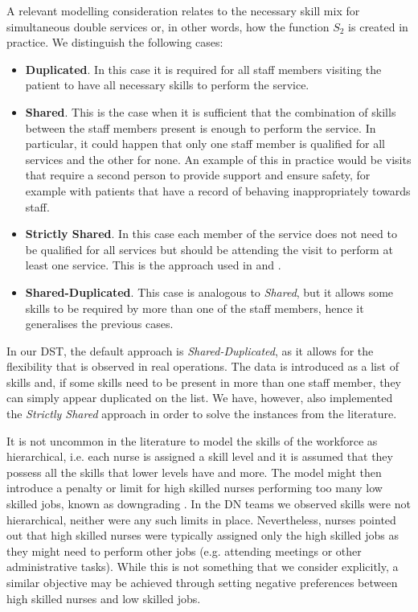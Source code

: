 \documentclass[a4paper,11pt,authoryear]{elsarticle}
\begin{document}
A relevant modelling consideration relates to the necessary skill mix for simultaneous double services or, in other words, how the function $S_2$ is created in practice. We distinguish the following cases:
\begin{itemize}
    \item \textbf{Duplicated}. In this case it is required for all staff members visiting the patient to have all necessary skills to perform the service.
    \item \textbf{Shared}. This is the case when it is sufficient that the combination of skills between the staff members present is enough to perform the service. In particular, it could happen that only one staff member is qualified for all services and the other for none. An example of this in practice would be visits that require a second person to provide support and ensure safety, for example with patients that have a record of behaving inappropriately towards staff.
    \item \textbf{Strictly Shared}. In this case each member of the service does not need to be qualified for all services but should be attending the visit to perform at least one service. This is the approach used in \cite{mankowska2014} and \cite{aithaddadene2016}.
    \item \textbf{Shared-Duplicated}. This case is analogous to \emph{Shared}, but it allows some skills to be required by more than one of the staff members, hence it generalises the previous cases.
\end{itemize}

\noindent In our DST, the default approach is \emph{Shared-Duplicated}, as it allows for the flexibility that is observed in real operations. The data is introduced as a list of skills and, if some skills need to be present in more than one staff member, they can simply appear duplicated on the list. We have, however, also implemented the \emph{Strictly Shared} approach in order to solve the instances from the literature.

It is not uncommon in the literature to model the skills of the workforce as hierarchical, i.e. each nurse is assigned a skill level and it is assumed that they possess all the skills that lower levels have and more. The model might then introduce a penalty or limit for high skilled nurses performing too many low skilled jobs, known as downgrading \cite[see, for example,][]{fikar2015}. In the DN teams we observed skills were not hierarchical, neither were any such limits in place. Nevertheless, nurses pointed out that high skilled nurses were typically assigned only the high skilled jobs as they might need to perform other jobs (e.g. attending meetings or other administrative tasks). While this is not something that we consider explicitly, a similar objective may be achieved through setting negative preferences between high skilled nurses and low skilled jobs.
\end{document}
